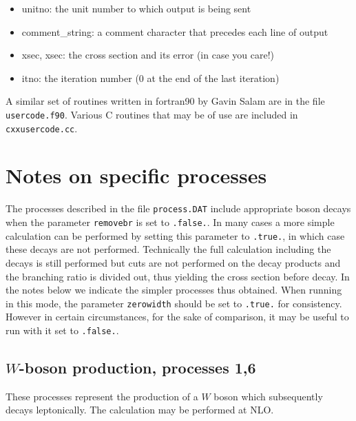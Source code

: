 \documentclass{article}
\begin{document}
\begin{itemize}
\begin{itemize}
\item  unitno: the unit number to which output is being sent                                                                         
\item comment\_string: a comment character that precedes each line of output                                                         
\item xsec, xsec: the cross section and its error (in case you care!)                                                               
\item itno: the iteration number (0 at the end of the last iteration)                                                               
\end{itemize}
\end{itemize}

A similar set of routines written in fortran90 by Gavin Salam are in the file {\tt  usercode.f90}.
Various C routines that may be of use are included in {\tt cxxusercode.cc}.

\section{Notes on specific processes}

\label{sec:specific}

The processes described in the file {\tt process.DAT} include appropriate boson decays when the parameter 
{\tt removebr} is set to {\tt .false.}. In many cases a more simple calculation can be performed by setting 
this parameter to {\tt .true.}, in which case these decays are not performed.
Technically the full calculation including the decays
is still performed but cuts are not performed on the decay products and the
branching ratio is divided out, thus yielding the cross section before decay.
In the notes below we indicate the simpler processes thus obtained. When running in
this mode, the parameter {\tt zerowidth} should be set to {\tt .true.} for consistency. However in certain 
circumstances, for the sake of comparison, it may be useful to run with it set to {\tt .false.}.

\subsection{$W$-boson production, processes 1,6}
\label{subsec:wboson}

These processes represent the production of a $W$ boson which subsequently
decays leptonically. The calculation may be performed at NLO.
\end{document}
